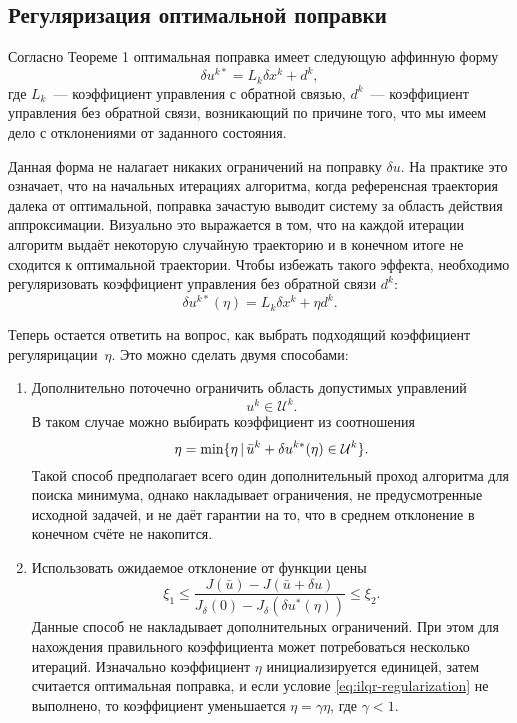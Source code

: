 \documentclass[../../doc.tex]{subfiles}
\begin{document}
    \subsection{Регуляризация оптимальной поправки}

    Согласно Теореме 1 оптимальная поправка имеет следующую аффинную форму
    \begin{equation*}
        \delta u^{k*} = L_k \delta x^k + d^k,
    \end{equation*}
    где $L_k$~--- коэффициент управления с обратной связью, $d^k$~--- коэффициент управления без обратной связи, возникающий по причине того, что мы имеем дело с отклонениями от заданного состояния.

    Данная форма не налагает никаких ограничений на поправку $\delta u$.
    На практике это означает,
        что на начальных итерациях алгоритма,
        когда референсная траектория далека от оптимальной,
        поправка зачастую выводит систему за область действия аппроксимации.
    Визуально это выражается в том, что на каждой итерации алгоритм выдаёт некоторую случайную траекторию и в конечном итоге не сходится к оптимальной траектории.
    Чтобы избежать такого эффекта, необходимо регуляризовать коэффициент управления без обратной связи $d^k$:
    \begin{equation*}
        \delta u^{k*}(\eta) = L_k \delta x^k + \eta d^k.
    \end{equation*}

    Теперь остается ответить на вопрос, как выбрать подходящий коэффициент регулярицации~$\eta$.
    Это можно сделать двумя способами:
    \begin{enumerate}
        \item Дополнительно поточечно ограничить область допустимых управлений
        $$
            u^k \in \mathcal{U}^k.
        $$
        В таком случае можно выбирать коэффициент из соотношения
        $$
            \eta = \textnormal{min} \{ \eta \,|\, \bar u^k + \delta u^{k*}(\eta) \in \mathcal{U}^k \}.
        $$
        Такой способ предполагает всего один дополнительный проход алгоритма для поиска минимума,
        однако накладывает ограничения, не предусмотренные исходной задачей,
        и не даёт гарантии на то, что в среднем отклонение в конечном счёте не накопится.

        \item Использовать ожидаемое отклонение от функции цены
        \begin{equation}\label{eq:ilqr-regularization}
            \xi_1
            \leqslant
            \frac{J(\bar u) - J(\bar u + \delta u)}{J_{\delta}(0) - J_{\delta}(\delta u^{*}(\eta))}
            \leqslant
            \xi_2.
        \end{equation}
        Данные способ не накладывает дополнительных ограничений.
        При этом для нахождения правильного коэффициента может потребоваться нес\-колько итераций.
        Изначально коэффициент $\eta$ инициализируется единицей, затем считается оптимальная поправка, и если условие \eqref{eq:ilqr-regularization} не выполнено, то коэффициент уменьшается $\eta = \gamma \eta$, где $\gamma < 1$.
    \end{enumerate}
\end{document}
